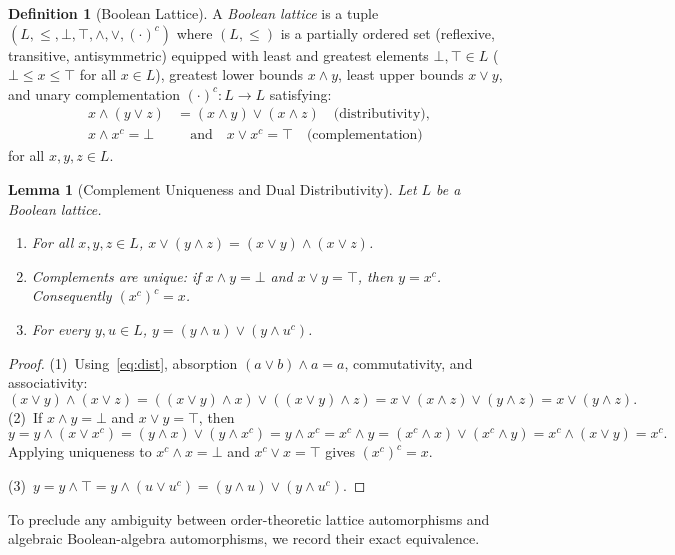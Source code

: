 \documentclass[11pt]{article}
\newtheorem{lemma}[theorem]{Lemma}
\theoremstyle{definition}
\newtheorem{definition}[theorem]{Definition}
\theoremstyle{remark}
\begin{document}
\begin{definition}[Boolean Lattice]
\label{def:boolean-lattice}
A \emph{Boolean lattice} is a tuple $(L, \le, \bot, \top, \wedge, \vee, (\cdot)^c)$ where $(L, \le)$ is a partially ordered set (reflexive, transitive, antisymmetric) equipped with least and greatest elements $\bot, \top \in L$ ($\bot \le x \le \top$ for all $x \in L$), greatest lower bounds $x \wedge y$, least upper bounds $x \vee y$, and unary complementation $(\cdot)^c : L \to L$ satisfying:
\begin{align}
  x \wedge (y \vee z) &= (x \wedge y) \vee (x \wedge z)
  \quad\text{(distributivity)}, \label{eq:dist}\\
  x \wedge x^c = \bot &\quad\text{and}\quad x \vee x^c = \top
  \quad\text{(complementation)} \label{eq:compl}
\end{align}
for all $x, y, z \in L$.
\end{definition}

\begin{lemma}[Complement Uniqueness and Dual Distributivity]
\label{lem:compl-unique}
Let $L$ be a Boolean lattice.
\begin{enumerate}
  \item For all $x, y, z \in L$, $x \vee (y \wedge z) = (x \vee y) \wedge (x \vee z)$.
  \item Complements are unique: if $x \wedge y = \bot$ and $x \vee y = \top$, then $y = x^c$. Consequently $(x^c)^c = x$.
  \item For every $y, u \in L$, $y = (y \wedge u) \vee (y \wedge u^c)$.
\end{enumerate}
\end{lemma}
\begin{proof}
(1)~Using~\eqref{eq:dist}, absorption $(a \vee b) \wedge a = a$, commutativity, and associativity:
\[
  (x \vee y) \wedge (x \vee z)
  = ((x \vee y) \wedge x) \vee ((x \vee y) \wedge z)
  = x \vee (x \wedge z) \vee (y \wedge z)
  = x \vee (y \wedge z).
\]
(2)~If $x \wedge y = \bot$ and $x \vee y = \top$, then
\[
  y = y \wedge (x \vee x^c) = (y \wedge x) \vee (y \wedge x^c) = y \wedge x^c
  = x^c \wedge y = (x^c \wedge x) \vee (x^c \wedge y) = x^c \wedge (x \vee y) = x^c.
\]
Applying uniqueness to $x^c \wedge x = \bot$ and $x^c \vee x = \top$ gives $(x^c)^c = x$.

(3)~$y = y \wedge \top = y \wedge (u \vee u^c) = (y \wedge u) \vee (y \wedge u^c)$.
\end{proof}

To preclude any ambiguity between order-theoretic lattice automorphisms and algebraic Boolean-algebra automorphisms, we record their exact equivalence.
\end{document}
